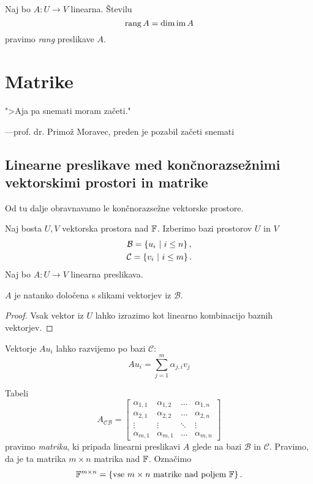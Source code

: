 \documentclass[12pt, a4paper]{article}
\begin{document}
\begin{definicija}
Naj bo $A\colon U\to V$ linearna. Številu
\[
\operatorname{rang} A=\dim\operatorname{im} A
\]
pravimo \emph{rang} preslikave $A$.
\end{definicija}

\newpage

\section{Matrike}

\epigraph{">Aja pa snemati moram začeti."}{---prof. dr. Primož Moravec, preden je pozabil začeti snemati}

\subsection{Linearne preslikave med končnorazsežnimi vektorskimi prostori in matrike}

Od tu dalje obravnavamo le končnorazsežne vektorske prostore.

Naj bosta $U,V$ vektorska prostora nad $\mathbb{F}$. Izberimo bazi prostorov $U$ in $V$
\begin{gather*}
\mathcal{B}=\left\{u_i~\middle\vert~i\leq n\right\},
\\
\mathcal{C}=\left\{v_i~\middle\vert~i\leq m\right\}.
\end{gather*}
Naj bo $A\colon U\to V$ linearna preslikava.

\begin{trditev}
$A$ je natanko določena s slikami vektorjev iz $\mathcal{B}$.
\end{trditev}

\begin{proof}
Vsak vektor iz $U$ lahko izrazimo kot linearno kombinacijo baznih vektorjev.
\end{proof}
Vektorje $Au_i$ lahko razvijemo po bazi $\mathcal{C}$:
\[
Au_i=\sum_{j=1}^m\alpha_{j,i}v_j
\]

\begin{okvir}
\begin{definicija}
Tabeli
\[
A_{\mathcal{CB}}=
\begin{bmatrix}
\alpha_{1,1} & \alpha_{1,2} & \dots & \alpha_{1,n} \\
\alpha_{2,1} & \alpha_{2,2} & \dots & \alpha_{2,n} \\
\vdots & \vdots & \ddots & \vdots \\
\alpha_{m,1} & \alpha_{m,1} & \dots & \alpha_{m,n}
\end{bmatrix} 
\]
pravimo \emph{matrika}, ki pripada linearni preslikavi $A$ glede na bazi $\mathcal{B}$ in $\mathcal{C}$. Pravimo, da je ta matrika $m\times n$ matrika nad $\mathbb{F}$. Označimo
\[
\mathbb{F}^{m\times n}=\left\{\text{vse $m\times n$ matrike nad poljem $\mathbb{F}$}\right\}.
\]
\end{definicija}
\end{okvir}
\end{document}
